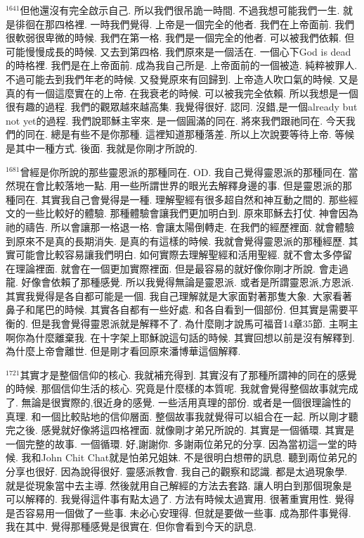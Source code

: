 \documentclass{book}
\begin{document}
$^{1641}$但他還沒有完全啟示自己.
所以我們很吊詭一時間.
不過我想可能我們一生.
就是徘徊在那四格裡.
一時我們覺得.
上帝是一個完全的他者.
我們在上帝面前.
我們很軟弱很卑微的時候.
我們在第一格.
我們是一個完全的他者.
可以被我們依賴.
但可能慢慢成長的時候.
又去到第四格.
我們原來是一個活在.
一個心下God is dead的時格裡.
我們是在上帝面前.
成為我自己所是.
上帝面前的一個被造.
純粹被罪人.
不過可能去到我們年老的時候.
又發覺原來有回歸到.
上帝造人吹口氣的時候.
又是真的有一個這麼實在的上帝.
在我衰老的時候.
可以被我完全依賴.
所以我想是一個很有趣的過程.
我們的觀眾越來越高集.
我覺得很好.
認同.
沒錯,是一個already but not yet的過程.
我們說耶穌主宰來.
是一個圓滿的同在.
將來我們跟祂同在.
今天我們的同在.
總是有些不是你那種.
這裡知道那種落差.
所以上次說要等待上帝.
等候是其中一種方式.
後面.
我就是你剛才所說的.

$^{1681}$曾經是你所說的那些靈恩派的那種同在.
OD.
我自己覺得靈恩派的那種同在.
當然現在會比較落地一點.
用一些所謂世界的眼光去解釋身邊的事.
但是靈恩派的那種同在.
其實我自己會覺得是一種.
理解聖經有很多超自然和神互動之間的.
那些經文的一些比較好的體驗.
那種體驗會讓我們更加明白到.
原來耶穌去打仗.
神會因為祂的禱告.
所以會讓那一格退一格.
會讓太陽倒轉走.
在我們的經歷裡面.
就會體驗到原來不是真的長期消失.
是真的有這樣的時候.
我就會覺得靈恩派的那種經歷.
其實可能會比較容易讓我們明白.
如何實際去理解聖經和活用聖經.
就不會太多停留在理論裡面.
就會在一個更加實際裡面.
但是最容易的就好像你剛才所說.
會走過龍.
好像會依賴了那種感覺.
所以我覺得無論是靈恩派.
或者是所謂靈恩派,方恩派.
其實我覺得是各自都可能是一個.
我自己理解就是大家面對著那隻大象.
大家看著鼻子和尾巴的時候.
其實各自都有一些好處.
和各自看到一個部份.
但其實是需要平衡的.
但是我會覺得靈恩派就是解釋不了.
為什麼剛才說馬可福音14章35節.
主啊主啊你為什麼離棄我.
在十字架上耶穌說這句話的時候.
其實回想以前是沒有解釋到.
為什麼上帝會離世.
但是剛才看回原來潘博華這個解釋.

$^{1721}$其實才是整個信仰的核心.
我就補充得到.
其實沒有了那種所謂神的同在的感覺的時候.
那個信仰生活的核心.
究竟是什麼樣的本質呢.
我就會覺得整個故事就完成了.
無論是很實際的,很近身的感覺.
一些活用真理的部份.
或者是一個很理論性的真理.
和一個比較貼地的信仰層面.
整個故事我就覺得可以組合在一起.
所以剛才聽完之後.
感覺就好像將這四格裡面.
就像剛才弟兄所說的.
其實是一個循環.
其實是一個完整的故事.
一個循環.
好,謝謝你.
多謝兩位弟兄的分享.
因為當初這一堂的時候.
我和John Chit Chat就是怕弟兄姐妹.
不是很明白想帶的訊息.
聽到兩位弟兄的分享也很好.
因為說得很好.
靈感派教會.
我自己的觀察和認識.
都是太過現象學.
就是從現象當中去主導.
然後就用自己解經的方法去套路.
讓人明白到那個現象是可以解釋的.
我覺得這件事有點太過了.
方法有時候太過實用.
很著重實用性.
覺得是否容易用一個做了一些事.
未必心安理得.
但就是要做一些事.
成為那件事覺得.
我在其中.
覺得那種感覺是很實在.
但你會看到今天的訊息.
\end{document}
